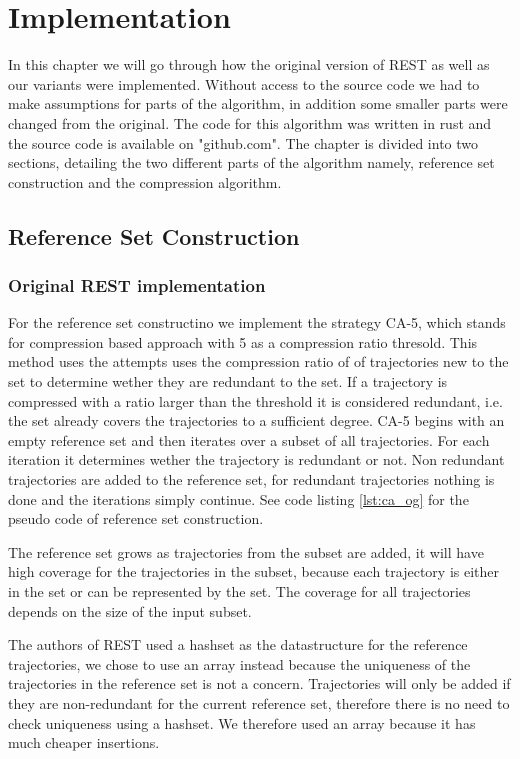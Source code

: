 \chapter{Implementation}
In this chapter we will go through how the original version of REST as well as our variants were implemented. Without access to the source code we had to make assumptions for parts of the algorithm, in addition some smaller parts were changed from the original. The code for this algorithm was written in rust and the source code is available on "github.com". The chapter is divided into two sections, detailing the two different parts of the algorithm namely, reference set construction and the compression algorithm.

\section{Reference Set Construction}
\subsection{Original REST implementation}
For the reference set constructino we implement the strategy CA-5, which stands for compression based approach with 5 as a compression ratio thresold. This method uses the attempts uses the compression ratio of of trajectories new to the set to determine wether they are redundant to the set. If a trajectory is compressed with a ratio larger than the threshold it is considered redundant, i.e. the set already covers the trajectories to a sufficient degree. CA-5 begins with an empty reference set and then iterates over a subset of all trajectories. For each iteration it determines wether the trajectory is redundant or not. Non redundant trajectories are added to the reference set, for redundant trajectories nothing is done and the iterations simply continue. See code listing \ref{lst:ca_og} for the pseudo code of reference set construction.



The reference set grows as trajectories from the subset are added, it will have high coverage for the trajectories in the subset, because each trajectory is either in the set or can be represented by the set. The coverage for all trajectories depends on the size of the input subset. %

The authors of REST used a hashset as the datastructure for the reference trajectories, we chose to use an array instead because the uniqueness of the trajectories in the reference set is not a concern. Trajectories will only be added if they are non-redundant for the current reference set, therefore there is no need to check uniqueness using a hashset. We therefore used an array because it has much cheaper insertions.

